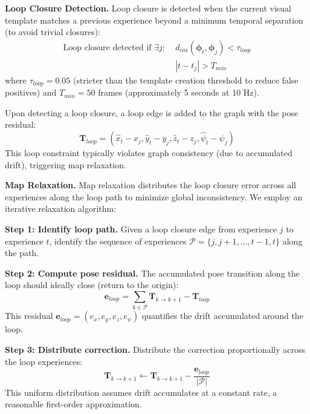 \textbf{Loop Closure Detection.} Loop closure is detected when the current visual template matches a previous experience beyond a minimum temporal separation (to avoid trivial closures):
\begin{equation}
    \begin{aligned}
        \text{Loop closure detected if } \exists j:\; & d_{cos}(\boldsymbol{\phi}_t, \boldsymbol{\phi}_j) < \tau_{loop} \\
                                                      & |t - t_j| > T_{min}
    \end{aligned}
\end{equation}
where $\tau_{loop} = 0.05$ (stricter than the template creation threshold to reduce false positives) and $T_{min} = 50$ frames (approximately 5 seconds at 10 Hz).

Upon detecting a loop closure, a loop edge is added to the graph with the pose residual:
\begin{equation}
    \mathbf{T}_{loop} = (\hat{x}_t - x_j, \hat{y}_t - y_j, \hat{z}_t - z_j, \hat{\psi}_t - \psi_j)
\end{equation}
This loop constraint typically violates graph consistency (due to accumulated drift), triggering map relaxation.

\textbf{Map Relaxation.} Map relaxation distributes the loop closure error across all experiences along the loop path to minimize global inconsistency. We employ an iterative relaxation algorithm:

\textbf{Step 1: Identify loop path.} Given a loop closure edge from experience $j$ to experience $t$, identify the sequence of experiences $\mathcal{P} = \{j, j+1, \ldots, t-1, t\}$ along the path.

\textbf{Step 2: Compute pose residual.} The accumulated pose transition along the loop should ideally close (return to the origin):
\begin{equation}
    \mathbf{e}_{loop} = \sum_{k \in \mathcal{P}} \mathbf{T}_{k \to k+1} - \mathbf{T}_{loop}
\end{equation}
This residual $\mathbf{e}_{loop} = (e_x, e_y, e_z, e_\psi)$ quantifies the drift accumulated around the loop.

\textbf{Step 3: Distribute correction.} Distribute the correction proportionally across the loop experiences:
\begin{equation}
    \mathbf{T}_{k \to k+1} \leftarrow \mathbf{T}_{k \to k+1} - \frac{\mathbf{e}_{loop}}{|\mathcal{P}|}
\end{equation}
This uniform distribution assumes drift accumulates at a constant rate, a reasonable first-order approximation.

